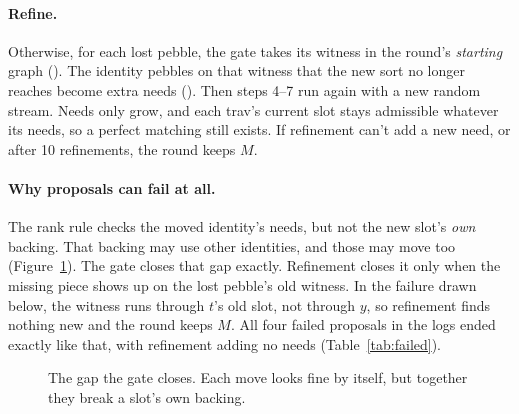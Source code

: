 \paragraph{Refine.} Otherwise, for each lost pebble, the gate takes its witness in the round's \emph{starting} graph (). The identity pebbles on that witness that the new sort no longer reaches become extra needs (). Then steps 4--7 run again with a new random stream. Needs only grow, and each trav's current slot stays admissible whatever its needs, so a perfect matching still exists. If refinement can't add a new need, or after 10 refinements, the round keeps $M$.

\paragraph{Why proposals can fail at all.} The rank rule checks the moved identity's needs, but not the new slot's \emph{own} backing. That backing may use other identities, and those may move too (Figure~\ref{fig:gap}). The gate closes that gap exactly. Refinement closes it only when the missing piece shows up on the lost pebble's old witness. In the failure drawn below, the witness runs through $t$'s old slot, not through $y$, so refinement finds nothing new and the round keeps $M$. All four failed proposals in the logs ended exactly like that, with refinement adding no needs (Table~\ref{tab:failed}).

\begin{figure}[tbp]
\centering
{}
\caption{The gap the gate closes. Each move looks fine by itself, but together they break a slot's own backing.}
\label{fig:gap}
\end{figure}

